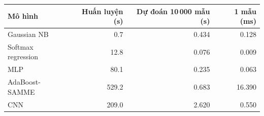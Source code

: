 \begin{tabular}{lrrr}
\toprule
Mô hình & Huấn luyện (s) & Dự đoán 10\,000 mẫu (s) & 1 mẫu (ms) \\
\midrule
Gaussian NB & 0.7 & 0.434 & 0.128 \\
Softmax regression & 12.8 & 0.076 & 0.009 \\
MLP & 80.1 & 0.235 & 0.063 \\
AdaBoost-SAMME & 529.2 & 0.683 & 16.390 \\
CNN & 209.0 & 2.620 & 0.550 \\
\bottomrule
\end{tabular}

